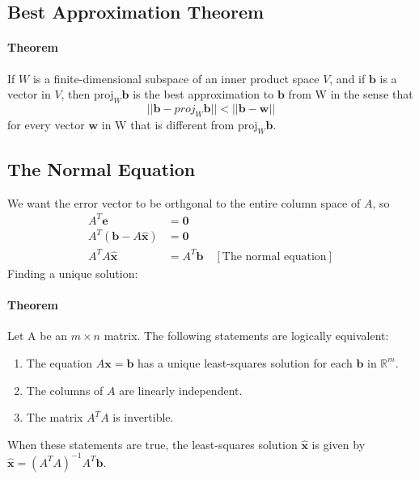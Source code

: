 \documentclass[../linear-algebra.tex]{subfiles}
\begin{document}
\subsection{Best Approximation Theorem}
\paragraph{Theorem} If $W$ is a finite-dimensional subspace of an inner product space $V$, and if $\mathbf{b}$ is a vector in $V$, then $\text{proj}_{W} \mathbf{b}$ is the best approximation to $\mathbf{b}$ from W in the sense that
$$||\mathbf{b}-proj_{W}\mathbf{b}||<||\mathbf{b}-\mathbf{w}||$$
for every vector $\mathbf{w}$ in W that is different from $\text{proj}_W \mathbf{b}$.

\subsection{The Normal Equation}
We want the error vector to be orthgonal to the entire column space of $A$, so
\begin{align*}
    A^T \mathbf{e} &= \mathbf{0}\\
    A^T (\mathbf{b} - A\mathbf{\hat{x}}) &= \mathbf{0}\\
    A^TA\mathbf{\hat{x}} &= A^T\mathbf{b} \quad [\text{The normal equation}]
\end{align*}
Finding a unique solution:
\paragraph{Theorem} Let A be an $m\times n$ matrix. The following statements are logically equivalent:
\begin{enumerate}
    \item The equation $A\mathbf{x}=\mathbf{b}$ has a unique least-squares solution for each $\mathbf{b}$ in $\mathbb{R}^{m}$.
    \item The columns of $A$ are linearly independent.
    \item The matrix $A^{T}A$ is invertible.
\end{enumerate}
When these statements are true, the least-squares solution $\mathbf{\hat{x}}$ is given by $\mathbf{\hat{x}}=(A^{T}A)^{-1}A^{T}\mathbf{b}$.
\end{document}
